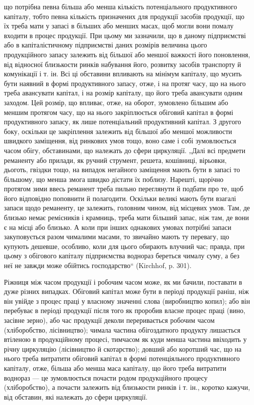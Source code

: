 \parcont{}  %
що потрібна певна більша або менша кількість потенціального продуктивного капіталу, тобто певна
кількість призначених для продукції засобів продукції, що їх треба мати у запасі в більших або
менших масах, щоб могли вони помалу входити в процес продукції. При цьому ми зазначили, що в даному
підприємстві або в капіталістичному підприємстві даних розмірів величина цього продукційного запасу
залежить від більшої або меншої важкості його поновлення, від відносної близькости ринків набування
його, розвитку засобів транспорту й комунікації і т. ін. Всі ці обставини впливають на мінімум
капіталу, що мусить бути наявний в формі продуктивного запасу, отже, і на протяг часу, що на нього
треба авансувати капітал, і на розмір капіталу, що його треба авансувати одним заходом. Цей розмір,
що впливає, отже, на оборот, зумовлено більшим або меншим протягом часу, що на нього закріплюється
обіговий капітал в формі продуктивного запасу, як лише потенціальний продуктивний капітал. З другого
боку, оскільки це закріплення залежить від більшої або меншої можливости швидкого заміщення, від
ринкових умов тощо, воно саме і собі зумовлюється часом обігу, обставинами, що належать до сфери
циркуляції. „Далі всі предмети реманенту або прилади, як ручний струмент, решета, кошівниці,
вірьовки, дьоготь, гвіздки тощо, на випадок негайного заміщення мають бути в запасі то більшому, що
менша змога швидко дістати їх поблизу. Нарешті, щорічно протягом зими ввесь реманент треба пильно
переглянути й подбати про те, щоб його відповідно поповнити й полагодити. Оскільки великі мають бути
взагалі запаси щодо реманенту, це залежить, головним чином, від місцевих умов. Там, де близько немає
ремісників і крамниць, треба мати більший запас, ніж там, де вони є на місці або близько. А коли при
інших однакових умовах потрібні запаси закуповується разом чималими масами, то звичайно мають ту
перевагу, що купують дешевше, особливо, коли для цього обирають влучний час; правда, при цьому з
обігового капіталу підприємства воднораз береться чималу суму, а без неї не завжди може обійтись
господарство“ (Kirchhof, p. 301).

Ріжниця між часом продукції і робочим часом може, як ми бачили, поставати в дуже різних випадках.
Обіговий капітал може бути в періоді продукції раніш, ніж він увійде з процес праці у власному
значенні слова (виробництво копил); або він перебуває в періоді продукції після того як проробив
власне процес праці (вино, засівне зерно), або час продукції деколи переривається робочим часом
(хліборобство, лісівництво); чимала частина обігоздатного продукту лишається втіленою в
продукційному процесі, тимчасом як куди менша частина ввіходить у річну циркуляцію (лісівництво й
скотарство); довший або коротший час, що на нього треба витратити обіговий капітал в формі
потенціяльного продуктивного капіталу, отже, більша або менша маса капіталу, що його треба витратити
воднораз — це зумовлюється почасти родом продукційного процесу (хліборобство), а почасти залежить
від близькости ринків і т. ін., коротко кажучи, від обставин, які належать до сфери циркуляції.

